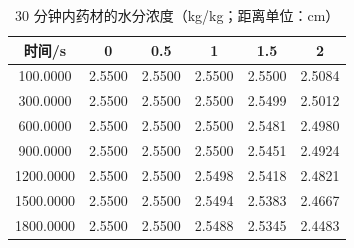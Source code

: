 \begin{table}[htbp]
  \centering
  \caption{30 分钟内药材的水分浓度（kg/kg；距离单位：cm）}
  \label{tab:q1-moisture}
  \begin{tabular}{cccccc}
    \toprule
    时间/s & 0 & 0.5 & 1 & 1.5 & 2 \\
    \midrule
    100.0000 & 2.5500 & 2.5500 & 2.5500 & 2.5500 & 2.5084 \\
    300.0000 & 2.5500 & 2.5500 & 2.5500 & 2.5499 & 2.5012 \\
    600.0000 & 2.5500 & 2.5500 & 2.5500 & 2.5481 & 2.4980 \\
    900.0000 & 2.5500 & 2.5500 & 2.5500 & 2.5451 & 2.4924 \\
    1200.0000 & 2.5500 & 2.5500 & 2.5498 & 2.5418 & 2.4821 \\
    1500.0000 & 2.5500 & 2.5500 & 2.5494 & 2.5383 & 2.4667 \\
    1800.0000 & 2.5500 & 2.5500 & 2.5488 & 2.5345 & 2.4483 \\
    \bottomrule
  \end{tabular}
\end{table}
